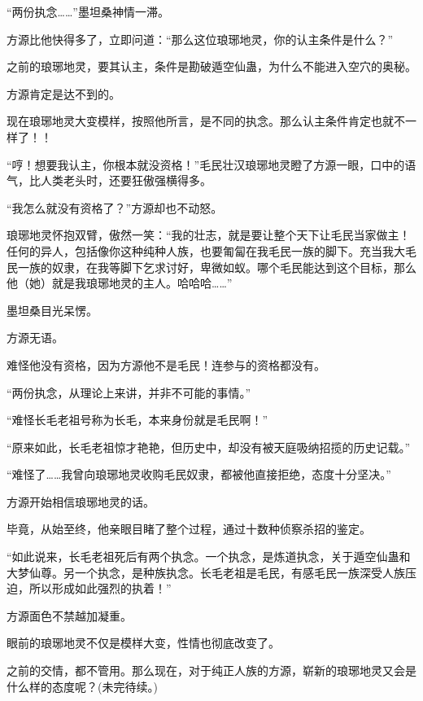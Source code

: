 \begin{this_body}
“两份执念……”墨坦桑神情一滞。

方源比他快得多了，立即问道：“那么这位琅琊地灵，你的认主条件是什么？”

之前的琅琊地灵，要其认主，条件是勘破遁空仙蛊，为什么不能进入空穴的奥秘。

方源肯定是达不到的。

现在琅琊地灵大变模样，按照他所言，是不同的执念。那么认主条件肯定也就不一样了！！

“哼！想要我认主，你根本就没资格！”毛民壮汉琅琊地灵瞪了方源一眼，口中的语气，比人类老头时，还要狂傲强横得多。

“我怎么就没有资格了？”方源却也不动怒。

琅琊地灵怀抱双臂，傲然一笑：“我的壮志，就是要让整个天下让毛民当家做主！任何的异人，包括像你这种纯种人族，也要匍匐在我毛民一族的脚下。充当我大毛民一族的奴隶，在我等脚下乞求讨好，卑微如蚁。哪个毛民能达到这个目标，那么他（她）就是我琅琊地灵的主人。哈哈哈……”

墨坦桑目光呆愣。

方源无语。

难怪他没有资格，因为方源他不是毛民！连参与的资格都没有。

“两份执念，从理论上来讲，并非不可能的事情。”

“难怪长毛老祖号称为长毛，本来身份就是毛民啊！”

“原来如此，长毛老祖惊才艳艳，但历史中，却没有被天庭吸纳招揽的历史记载。”

“难怪了……我曾向琅琊地灵收购毛民奴隶，都被他直接拒绝，态度十分坚决。”

方源开始相信琅琊地灵的话。

毕竟，从始至终，他亲眼目睹了整个过程，通过十数种侦察杀招的鉴定。

“如此说来，长毛老祖死后有两个执念。一个执念，是炼道执念，关于遁空仙蛊和大梦仙尊。另一个执念，是种族执念。长毛老祖是毛民，有感毛民一族深受人族压迫，所以形成如此强烈的执着！”

方源面色不禁越加凝重。

眼前的琅琊地灵不仅是模样大变，性情也彻底改变了。

之前的交情，都不管用。那么现在，对于纯正人族的方源，崭新的琅琊地灵又会是什么样的态度呢？(未完待续。)

\end{this_body}

